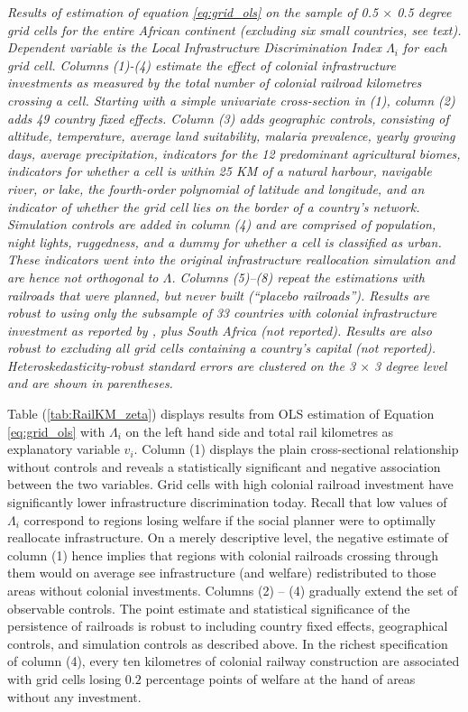 \documentclass[11pt, oneside]{article}   	%
\let\oldref\ref
\renewcommand{\ref}[1]{(\oldref{#1})}
\newcommand{\mysubcaption}[1]{
\justify
\begin{spacing}{0.7}
\textit{\footnotesize #1}
\end{spacing}}
\begin{document}
\begin{table}[t]
\mysubcaption{Results of estimation of equation \eqref{eq:grid_ols} on the sample of 0.5 $\times$ 0.5 degree grid cells for the entire African continent (excluding six small countries, see text). Dependent variable is the Local Infrastructure Discrimination Index $\Lambda_{i}$ for each grid cell. Columns (1)-(4) estimate the effect of colonial infrastructure investments as measured by the total number of colonial railroad kilometres crossing a cell. Starting with a simple univariate cross-section in (1), column (2) adds 49 country fixed effects. Column (3) adds geographic controls, consisting of altitude, temperature, average land suitability, malaria prevalence, yearly growing days, average precipitation, indicators for the 12 predominant agricultural biomes, indicators for whether a cell is within 25 KM of a natural harbour, navigable river, or lake, the fourth-order polynomial of latitude and longitude, and an indicator of whether the grid cell lies on the border of a country's network. Simulation controls are added in column (4) and are comprised of population, night lights, ruggedness, and a dummy for whether a cell is classified as urban. These indicators went into the original infrastructure reallocation simulation and are hence not orthogonal to $\Lambda$. Columns (5)--(8) repeat the estimations with railroads that were planned, but never built (``placebo railroads''). Results are robust to using only the subsample of 33 countries with colonial infrastructure investment as reported by \cite{Jedwab_PermanentEffectsTransportation_2016a}, plus South Africa (not reported). Results are also robust to excluding all grid cells containing a country's capital (not reported). Heteroskedasticity-robust standard errors are clustered on the 3 $\times$ 3 degree level and are shown in parentheses.}
\end{table}

Table \ref{tab:RailKM_zeta} displays results from OLS estimation of Equation \eqref{eq:grid_ols} with $\Lambda_{i}$ on the left hand side and total rail kilometres as explanatory variable $v_{i}$. Column (1) displays the plain cross-sectional relationship without controls and reveals a statistically significant and negative association between the two variables. Grid cells with high colonial railroad investment have significantly lower infrastructure discrimination today. Recall that low values of $\Lambda_{i}$ correspond to regions losing welfare if the social planner were to optimally reallocate infrastructure. On a merely descriptive level, the negative estimate of column (1) hence implies that regions with colonial railroads crossing through them would on average see infrastructure (and welfare) redistributed to those areas without colonial investments. Columns (2) -- (4) gradually extend the set of observable controls. The point estimate and statistical significance of the persistence of railroads is robust to including country fixed effects, geographical controls, and simulation controls as described above. In the richest specification of column (4), every ten kilometres of colonial railway construction are associated with grid cells losing $0.2$ percentage points of welfare at the hand of areas without any investment.
\end{document}
